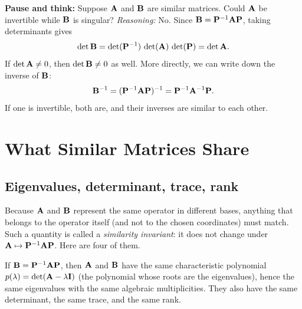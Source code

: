 \begin{recoverybox}
\textbf{Pause and think:} Suppose $\mathbf{A}$ and $\mathbf{B}$ are similar matrices. Could $\mathbf{A}$ be invertible while $\mathbf{B}$ is singular?
\emph{Reasoning:} No. Since $\mathbf{B}=\mathbf{P}^{-1}\mathbf{A}\mathbf{P}$, taking determinants gives
\[
\det\mathbf{B} = \det(\mathbf{P}^{-1})\,\det(\mathbf{A})\,\det(\mathbf{P}) = \det\mathbf{A}.
\]
If $\det\mathbf{A} \neq 0$, then $\det\mathbf{B} \neq 0$ as well. More directly, we can write down the inverse of $\mathbf{B}$:
\[
\mathbf{B}^{-1} = (\mathbf{P}^{-1}\mathbf{A}\mathbf{P})^{-1} = \mathbf{P}^{-1}\mathbf{A}^{-1}\mathbf{P}.
\]
If one is invertible, both are, and their inverses are similar to each other.
\end{recoverybox}

\section{What Similar Matrices Share}
\label{ch28:invariants}

\subsection{Eigenvalues, determinant, trace, rank}

Because $\mathbf{A}$ and $\mathbf{B}$ represent the same operator in different bases, anything that
belongs to the operator itself (and not to the chosen coordinates) must match. Such a
quantity is called a \emph{similarity invariant}: it does not change under
$\mathbf{A}\mapsto\mathbf{P}^{-1}\mathbf{A}\mathbf{P}$. Here are four of them.

\begin{theorem}
\label{ch28:thm-invariants}
If $\mathbf{B}=\mathbf{P}^{-1}\mathbf{A}\mathbf{P}$, then $\mathbf{A}$ and $\mathbf{B}$ have the same
characteristic polynomial $p(\lambda) = \det(\mathbf{A}-\lambda\mathbf{I})$ (the polynomial whose roots are the eigenvalues), hence the same eigenvalues with the same algebraic
multiplicities. They also have the same determinant, the same trace, and the same rank.
\end{theorem}

